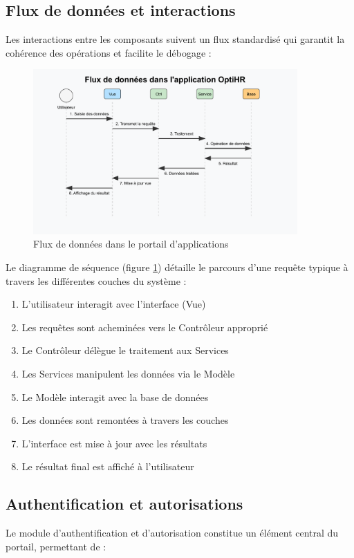 \subsection{Flux de données et interactions}
Les interactions entre les composants suivent un flux standardisé qui garantit la cohérence des opérations
et facilite le débogage :

\begin{figure}[H]
    \centering
    \includegraphics[width=0.9\textwidth]{images/diagrammes/architecture/flux-donnees.pdf}
    \caption{Flux de données dans le portail d'applications}
    \label{fig:flux_donnees}
\end{figure}

Le diagramme de séquence (figure \ref{fig:flux_donnees}) détaille le parcours d'une requête typique à travers les différentes couches du système :

\begin{enumerate}
    \item L'utilisateur interagit avec l'interface (Vue)
    \item Les requêtes sont acheminées vers le Contrôleur approprié
    \item Le Contrôleur délègue le traitement aux Services
    \item Les Services manipulent les données via le Modèle
    \item Le Modèle interagit avec la base de données
    \item Les données sont remontées à travers les couches
    \item L'interface est mise à jour avec les résultats
    \item Le résultat final est affiché à l'utilisateur
\end{enumerate}

\subsection{Authentification et autorisations}
Le module d'authentification et d'autorisation constitue un élément central du portail, permettant de :

